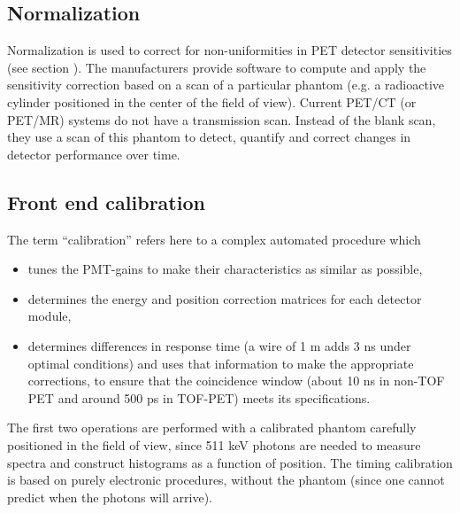 \subsection{Normalization}
Normalization is used to correct for non-uniformities in PET detector
sensitivities (see section ). The
manufacturers provide software to compute and apply the sensitivity
correction based on a scan of a particular phantom (e.g. a radioactive
cylinder positioned in the center of the field of view). Current
PET/CT (or PET/MR) systems do not have a transmission scan. Instead of
the blank scan, they use a scan of this phantom to detect, quantify
and correct changes in detector performance over time.

\subsection{Front end calibration}
The term ``calibration'' refers here to a complex automated procedure
which
\begin{itemize}
  \item tunes the PMT-gains to make their characteristics as similar as
        possible,
  \item determines the energy and position correction matrices for each
        detector module,
  \item determines differences in response time (a wire of 1 m adds 3
        ns under optimal conditions) and uses that information to make
        the appropriate corrections, to ensure that the coincidence
        window (about 10 ns in non-TOF PET and around 500 ps in
        TOF-PET) meets its specifications.
\end{itemize}
The first two operations are performed with a calibrated phantom carefully
positioned in the field of view, since 511 keV photons are needed to measure
spectra and construct histograms as a function of position. The timing
calibration is based on purely electronic procedures, without the phantom
(since one cannot predict when the photons will arrive).


